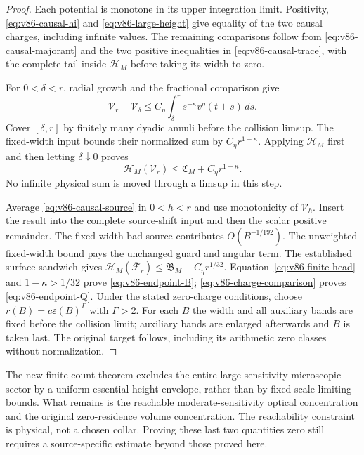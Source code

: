 \begin{proof}
Each potential is monotone in its upper integration limit. Positivity,
\eqref{eq:v86-causal-hi} and \eqref{eq:v86-large-height} give equality
of the two causal charges, including infinite values. The remaining
comparisons follow from \eqref{eq:v86-causal-majorant} and the two
positive inequalities in \eqref{eq:v86-causal-trace}, with the
complete tail inside $\mathcal H_M$ before taking its width to zero.

For $0<\delta<r$, radial growth and the fractional comparison give
\[
 \mathcal V_r-\mathcal V_\delta
       \le C_\eta\int_\delta^r s^{-\kappa}v^\eta(t+s)\,ds.
\]
Cover $[\delta,r]$ by finitely many dyadic annuli before the collision
limsup. The fixed-width input bounds their normalized sum by
$C_\eta r^{1-\kappa}$. Applying $\mathcal H_M$ first and then
letting $\delta\downarrow0$ proves
\begin{equation}\label{eq:v86-finite-head}
 \mathcal H_M(\mathcal V_r)
                 \le\mathfrak C_M+C_\eta r^{1-\kappa}.
\end{equation}
No infinite physical sum is moved through a limsup in this step.

Average \eqref{eq:v86-causal-source} in $0<h<r$ and use monotonicity
of $\mathcal V_h$. Insert the result into the complete source-shift
input and then the scalar positive remainder. The fixed-width bad
source contributes $O(B^{-1/192})$. The unweighted fixed-width
bound pays the unchanged guard and angular term. The established
surface sandwich gives
$\mathcal H_M(\overline{\mathcal F}_r)
\le\mathfrak B_M+C_\eta r^{1/32}$.
Equation~\eqref{eq:v86-finite-head} and $1-\kappa>1/32$ prove
\eqref{eq:v86-endpoint-B}; \eqref{eq:v86-charge-comparison} proves
\eqref{eq:v86-endpoint-Q}. Under the stated zero-charge conditions,
choose $r(B)=c\varepsilon(B)^\Gamma$ with $\Gamma>2$.
For each $B$ the width and all auxiliary bands are fixed before the
collision limit; auxiliary bands are enlarged afterwards and $B$
is taken last. The original target follows, including its arithmetic
zero classes without normalization.
\end{proof}

The new finite-count theorem excludes the entire large-sensitivity
microscopic sector by a uniform essential-height envelope, rather
than by fixed-scale limiting bounds. What remains is the reachable
moderate-sensitivity optical concentration and the original
zero-residence volume concentration. The reachability constraint is
physical, not a chosen collar. Proving these last two quantities zero
still requires a source-specific estimate beyond those proved here.
